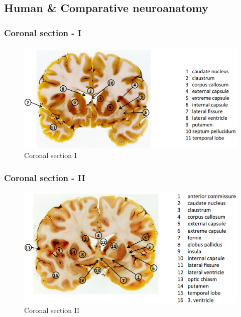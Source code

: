 \documentclass[12pt,article,oneside,a4paper]{memoir}
\begin{document}
\subsection{Human \& Comparative neuroanatomy}

\subsubsection{Coronal section - I}
\begin{figure}[H]
	\centering
  	\includegraphics[width=\linewidth]{imgs/coronal-section-I-answer.png}
	\caption{Coronal section I}
  	\label{fig:coronalSectionI-answer}
\end{figure}

\subsubsection{Coronal section - II}
\begin{figure}[H]
	\centering
  	\includegraphics[width=\linewidth]{imgs/coronal-section-II-answer.png}
	\caption{Coronal section II}
  	\label{fig:coronalSectionII-answer}
\end{figure}
\end{document}
